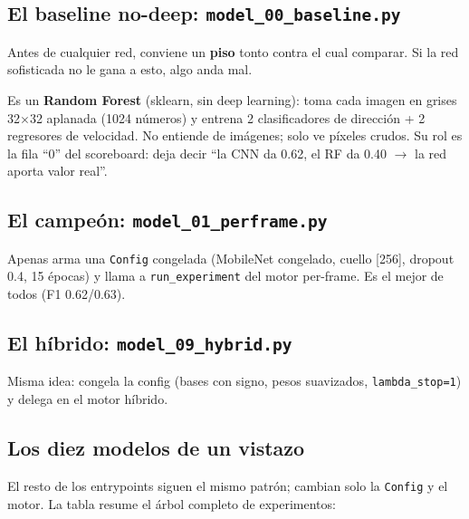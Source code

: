 \documentclass[11pt,a4paper]{article}
\newcommand{\code}[1]{\lstinline[basicstyle=\ttfamily\normalsize]|#1|}
\begin{document}
\subsection{El baseline no-deep: \texttt{model\_00\_baseline.py}}
Antes de cualquier red, conviene un \textbf{piso} tonto contra el cual comparar. Si la red sofisticada no le
gana a esto, algo anda mal.



Es un \textbf{Random Forest} (sklearn, sin deep learning): toma cada imagen en grises 32$\times$32 aplanada
(1024 números) y entrena 2 clasificadores de dirección + 2 regresores de velocidad. No entiende de imágenes;
solo ve píxeles crudos. Su rol es la fila ``0'' del scoreboard: deja decir ``la CNN da 0.62, el RF da 0.40
$\rightarrow$ la red aporta valor real''.

\subsection{El campeón: \texttt{model\_01\_perframe.py}}

Apenas arma una \code{Config} congelada (MobileNet congelado, cuello [256], dropout 0.4, 15 épocas) y llama a
\code{run_experiment} del motor per-frame. Es el mejor de todos (F1 0.62/0.63).

\subsection{El híbrido: \texttt{model\_09\_hybrid.py}}

Misma idea: congela la config (bases con signo, pesos suavizados, \code{lambda_stop=1}) y delega en el motor
híbrido.

\subsection{Los diez modelos de un vistazo}
El resto de los entrypoints siguen el mismo patrón; cambian solo la \code{Config} y el motor. La tabla resume
el árbol completo de experimentos:
\end{document}
